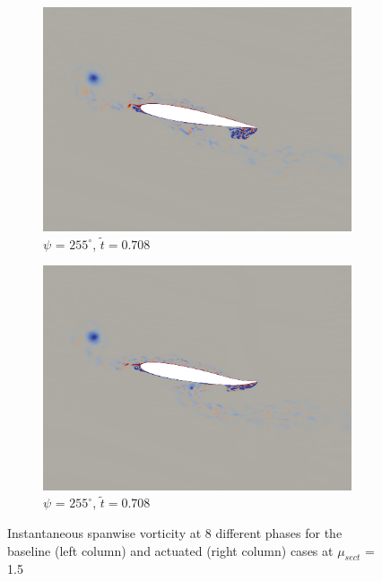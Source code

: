 \begin{figure}[H]
	\begin{subfigure}[b]{0.4\textwidth}
		\centering
		\includegraphics[width=1\textwidth]{figures/mu_1pt5/vorticity/baseline/phase_255.png}
		\caption{ $\psi$ = $255^\circ$, $\tilde{t}=0.708$}
		\label{fig:mu_1pt5_baseline_psi255}
	\end{subfigure}
	\begin{subfigure}[b]{0.4\textwidth}
		\centering
		\includegraphics[width=1\textwidth]{figures/mu_1pt5/vorticity/AC/phase_255.png}
		\caption{ $\psi$ = $255^\circ$, $\tilde{t}=0.708$}
		\label{fig:mu_1pt5_AC_psi255}
	\end{subfigure}
	
	
	\caption{Instantaneous spanwise vorticity at 8 different phases for the baseline (left column) and actuated (right column) cases at $\mu_{sect}$ = 1.5}
\end{figure}

